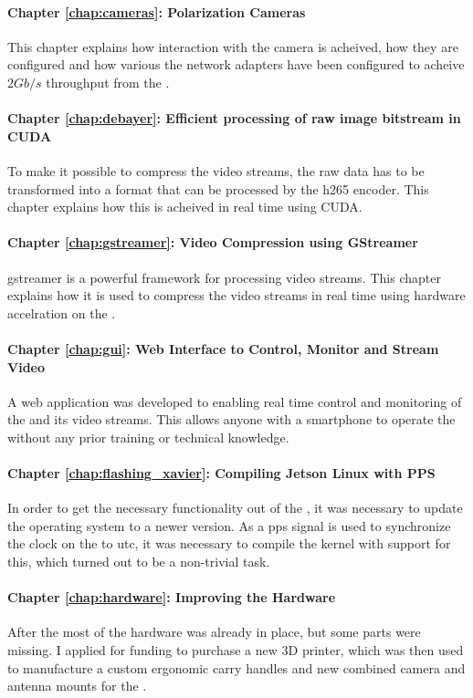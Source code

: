 \paragraph{Chapter \ref{chap:cameras}: Polarization Cameras}
This chapter explains how interaction with the camera is acheived, how they are configured and how various the network adapters have been configured to acheive $2Gb/s$ throughput from the \cams.

\paragraph{Chapter \ref{chap:debayer}: Efficient processing of raw image bitstream in CUDA}
To make it possible to compress the video streams, the raw data has to be transformed into a format that can be processed by the \gls{h265} encoder.
This chapter explains how this is acheived in real time using CUDA.

\paragraph{Chapter \ref{chap:gstreamer}: Video Compression using GStreamer}
\gls{gstreamer} is a powerful framework for processing video streams.
This chapter explains how it is used to compress the video streams in real time using hardware accelration on the \jx.

\paragraph{Chapter \ref{chap:gui}: Web Interface to Control, Monitor and Stream Video}
A web application was developed to enabling real time control and monitoring of the \sr and its video streams.
This allows anyone with a smartphone to operate the \sr without any prior training or technical knowledge.


\paragraph{Chapter \ref{chap:flashing_xavier}: Compiling Jetson Linux with PPS}
In order to get the necessary functionality out of the \jx, it was necessary to update the operating system to a newer version.
As a \gls{pps} signal is used to synchronize the clock on the \jx to \gls{utc}, it was necessary to compile the kernel with support for this, which turned out to be a non-trivial task.

\paragraph{Chapter \ref{chap:hardware}: Improving the Hardware}
After the \preproject most of the hardware was already in place, but some parts were missing.
I applied for funding to purchase a new 3D printer, which was then used to manufacture a custom ergonomic carry handles and new combined camera and antenna mounts for the \sr.

